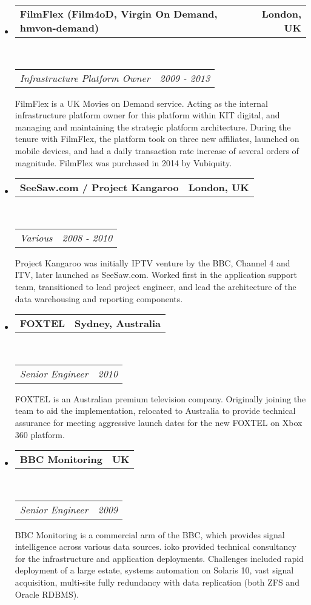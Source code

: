 \documentclass[10pt,a4paper]{article}
\makeatletter
\newcommand{\headerrow}[2]
{\begin{tabular*}{\linewidth}{l@{\extracolsep{\fill}}r}
    #1 &
    #2 \\
\end{tabular*}}
\makeatother
\begin{document}
\begin{itemize}
\begin{itemize}
            \item 
            \headerrow
                {\textbf{FilmFlex (Film4oD, Virgin On Demand, hmvon-demand)}}
                {\textbf{London, UK}}
            \\
            \headerrow
                {\emph{Infrastructure Platform Owner}}
                {\emph{2009 - 2013}}
                FilmFlex is a UK Movies on Demand service. Acting as the internal infrastructure platform owner for this platform within KIT digital, and managing and maintaining the strategic platform architecture. During the tenure with FilmFlex, the platform took on three new affiliates, launched on mobile devices, and had a daily transaction rate increase of several orders of magnitude. FilmFlex was purchased in 2014 by Vubiquity.
            \item 
            \headerrow
                {\textbf{SeeSaw.com / Project Kangaroo}}
                {\textbf{London, UK}}
            \\
            \headerrow
                {\emph{Various}}
                {\emph{2008 - 2010}}
                Project Kangaroo was initially IPTV venture by the BBC, Channel 4 and ITV, later launched as SeeSaw.com. Worked first in the application support team, transitioned to lead project engineer, and lead the architecture of the data warehousing and reporting components.
            \item 
            \headerrow
                {\textbf{FOXTEL}}
                {\textbf{Sydney, Australia}}
            \\
            \headerrow
                {\emph{Senior Engineer}}
                {\emph{2010}}
                FOXTEL is an Australian premium television company. Originally joining the team to aid the implementation, relocated to Australia to provide technical assurance for meeting aggressive launch dates for the new FOXTEL on Xbox 360 platform.
            \item 
            \headerrow
                {\textbf{BBC Monitoring}}
                {\textbf{UK}}
            \\
            \headerrow
                {\emph{Senior Engineer}}
                {\emph{2009}}
                BBC Monitoring is a commercial arm of the BBC, which provides signal intelligence across various data sources. ioko provided technical consultancy for the infrastructure and application deployments. Challenges included rapid deployment of a large estate, systems automation on Solaris 10, vast signal acquisition, multi-site fully redundancy with data replication (both ZFS and Oracle RDBMS).
        \end{itemize}


\end{itemize}
\end{document}
